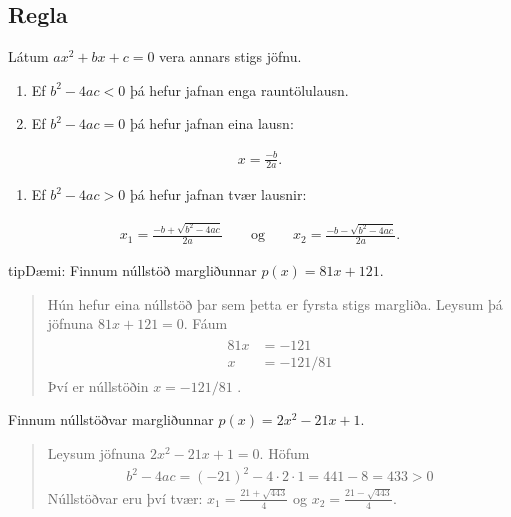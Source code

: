 \documentclass[a4paper,10pt,icelandic]{sphinxmanual}
\begin{document}
\subsection{Regla}
\label{\detokenize{Kafli06:id2}}
Látum \(ax^2+bx+c=0\) vera annars stigs jöfnu.
\begin{enumerate}
%
\item {} 
Ef \(b^2-4ac<0\) þá hefur jafnan enga rauntölulausn.

\item {} 
Ef \(b^2-4ac=0\) þá hefur jafnan eina lausn:

\end{enumerate}
\begin{equation*}
\begin{split}x=\frac{-b}{2a}.\end{split}
\end{equation*}\begin{enumerate}
%
\setcounter{enumi}{2}
\item {} 
Ef \(b^2-4ac>0\) þá hefur jafnan tvær lausnir:

\end{enumerate}
\begin{equation*}
\begin{split}x_1=\frac{-b+\sqrt{b^2-4ac}}{2a} \qquad \text{og} \qquad x_2=\frac{-b-\sqrt{b^2-4ac}}{2a}.\end{split}
\end{equation*}
\begin{sphinxadmonition}{tip}{Dæmi:}
 Finnum núllstöð margliðunnar \(p(x)=81x+121\).
\begin{quote}

Hún hefur eina núllstöð þar sem þetta er fyrsta stigs margliða. Leysum þá jöfnuna \(81x+121=0\). Fáum
\begin{equation*}
\begin{split}\begin{aligned}
81x &=-121 \\
x &=-121/81
\end{aligned}\end{split}
\end{equation*}
Því er núllstöðin \(x=-121/81\) .
\end{quote}

 Finnum núllstöðvar margliðunnar \(p(x)=2x^2-21x+1\).
\begin{quote}

Leysum jöfnuna \(2x^2-21x+1=0\). Höfum
\begin{equation*}
\begin{split}b^2-4ac=(-21)^2-4 \cdot 2 \cdot 1=441-8=433 >0\end{split}
\end{equation*}
Núllstöðvar eru því tvær: \(x_1=\frac{21+\sqrt{443}}{4}\) og \(x_2=\frac{21-\sqrt{443}}{4}\).
\end{quote}
\end{sphinxadmonition}
\end{document}
